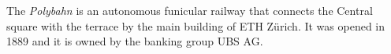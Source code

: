The \emph{Polybahn} is an autonomous funicular railway that connects the Central square with the terrace by the main building of ETH Zürich.
It was opened in 1889 and it is owned by the banking group UBS AG.
